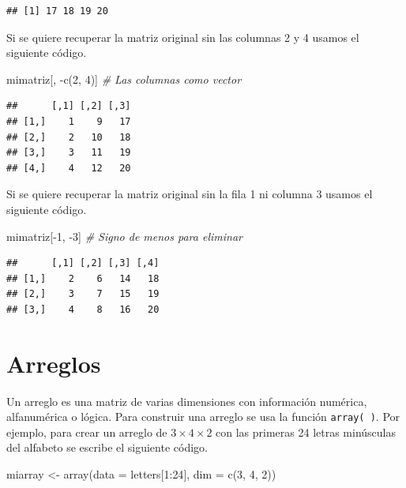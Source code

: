 \documentclass[
]{book}
\newenvironment{Shaded}{\begin{snugshade}}{\end{snugshade}}
\newcommand{\AttributeTok}[1]{\textcolor[rgb]{0.77,0.63,0.00}{#1}}
\newcommand{\CommentTok}[1]{\textcolor[rgb]{0.56,0.35,0.01}{\textit{#1}}}
\newcommand{\DecValTok}[1]{\textcolor[rgb]{0.00,0.00,0.81}{#1}}
\newcommand{\FunctionTok}[1]{\textcolor[rgb]{0.00,0.00,0.00}{#1}}
\newcommand{\NormalTok}[1]{#1}
\newcommand{\OtherTok}[1]{\textcolor[rgb]{0.56,0.35,0.01}{#1}}
\newcommand{\SpecialCharTok}[1]{\textcolor[rgb]{0.00,0.00,0.00}{#1}}
\begin{document}
\begin{verbatim}
## [1] 17 18 19 20
\end{verbatim}

Si se quiere recuperar la matriz original sin las columnas 2 y 4 usamos el siguiente código.

\begin{Shaded}
\begin{Highlighting}[]
\NormalTok{mimatriz[, }\SpecialCharTok{{-}}\FunctionTok{c}\NormalTok{(}\DecValTok{2}\NormalTok{, }\DecValTok{4}\NormalTok{)]  }\CommentTok{\# Las columnas como vector}
\end{Highlighting}
\end{Shaded}

\begin{verbatim}
##      [,1] [,2] [,3]
## [1,]    1    9   17
## [2,]    2   10   18
## [3,]    3   11   19
## [4,]    4   12   20
\end{verbatim}

Si se quiere recuperar la matriz original sin la fila 1 ni columna 3 usamos el siguiente código.

\begin{Shaded}
\begin{Highlighting}[]
\NormalTok{mimatriz[}\SpecialCharTok{{-}}\DecValTok{1}\NormalTok{, }\SpecialCharTok{{-}}\DecValTok{3}\NormalTok{]  }\CommentTok{\# Signo de menos para eliminar}
\end{Highlighting}
\end{Shaded}

\begin{verbatim}
##      [,1] [,2] [,3] [,4]
## [1,]    2    6   14   18
## [2,]    3    7   15   19
## [3,]    4    8   16   20
\end{verbatim}

\hypertarget{arreglos}{%
\section{\texorpdfstring{Arreglos  }{Arreglos  }}\label{arreglos}}

Un arreglo es una matriz de varias dimensiones con información numérica, alfanumérica o lógica. Para construir una arreglo se usa la función \texttt{array(\ )}. Por ejemplo, para crear un arreglo de \(3 \times 4 \times 2\) con las primeras 24 letras minúsculas del alfabeto se escribe el siguiente código.

\begin{Shaded}
\begin{Highlighting}[]
\NormalTok{miarray }\OtherTok{\textless{}{-}} \FunctionTok{array}\NormalTok{(}\AttributeTok{data =}\NormalTok{ letters[}\DecValTok{1}\SpecialCharTok{:}\DecValTok{24}\NormalTok{], }\AttributeTok{dim =} \FunctionTok{c}\NormalTok{(}\DecValTok{3}\NormalTok{, }\DecValTok{4}\NormalTok{, }\DecValTok{2}\NormalTok{))}
\end{Highlighting}
\end{Shaded}
\end{document}
